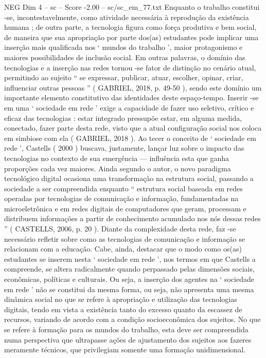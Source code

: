 \begin{textsample}{NEG Dim 4 – sc – Score -2.00 – sc/sc\_em\_77.txt}
Enquanto o trabalho constitui -se, incontestavelmente, como atividade necessária à reprodução da existência humana ; de outra parte, a tecnologia figura como força produtiva e bem social, de maneira que sua apropriação por parte dos(as) estudantes pode implicar uma inserção mais qualificada nos ‘ mundos do trabalho ’, maior protagonismo e maiores possibilidades de inclusão social.
Em outras palavras, o domínio das tecnologias e a inserção nas redes tornou -se fator de distinção no cenário atual, permitindo ao sujeito “ se expressar, publicar, atuar, escolher, opinar, criar, influenciar outras pessoas ” ( GABRIEL, 2018, p. 49-50 ), sendo este domínio um importante elemento constitutivo das identidades deste espaço-tempo.
Inserir -se em uma ‘ sociedade em rede ’ exige a capacidade de fazer uso seletivo, crítico e eficaz das tecnologias : estar integrado pressupõe estar, em alguma medida, conectado, fazer parte desta rede, visto que a atual configuração social nos coloca em simbiose com ela ( GABRIEL, 2018 ).
Ao tecer o conceito de ‘ sociedade em rede ’, Castells ( 2000 ) buscava, justamente, lançar luz sobre o impacto das tecnologias no contexto de sua emergência — influência esta que ganha proporções cada vez maiores.
Ainda segundo o autor, o novo paradigma tecnológico digital ocasiona uma transformação na estrutura social, passando a sociedade a ser compreendida enquanto “ estrutura social baseada em redes operadas por tecnologias de comunicação e informação, fundamentadas na microeletrônica e em redes digitais de computadores que geram, processam e distribuem informações a partir de conhecimento acumulado nos nós dessas redes ” ( CASTELLS, 2006, p. 20 ).
Diante da complexidade desta rede, faz -se necessário refletir sobre como as tecnologias de comunicação e informação se relacionam com a educação.
Cabe, ainda, destacar que o modo como os(as) estudantes se inserem nesta ‘ sociedade em rede ’, nos termos em que Castells a compreende, se altera radicalmente quando perpassado pelas dimensões sociais, econômicas, políticas e culturais.
Ou seja, a inserção dos agentes na ‘ sociedade em rede ’ não se constitui da mesma forma, ou seja, não apresenta uma mesma dinâmica social no que se refere à apropriação e utilização das tecnologias digitais, tendo em vista a existência tanto do excesso quanto da escassez de recursos, variando de acordo com a condição socioeconômica dos sujeitos.
No que se refere à formação para os mundos do trabalho, esta deve ser compreendida numa perspectiva que ultrapasse ações de ajustamento dos sujeitos aos fazeres meramente técnicos, que privilegiam somente uma formação unidimensional.

\end{textsample}
